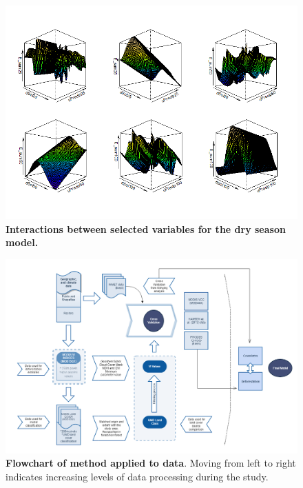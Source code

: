 \begin{landscape}
\begin{figure}[H]
  \centering
  \includegraphics[width=1.5\textwidth, inner]{visgamd.png}
\caption{\textbf{Interactions between selected variables for the dry season model.}}
\label{fig:visgamd}
\end{figure}


\begin{figure}[H]
  \centering
  \includegraphics[width=1.5\textwidth, inner]{method.png}
\caption{\textbf{Flowchart of method applied to data}. Moving from left to right indicates increasing levels of data processing during the study.}
\label{fig:method}
\end{figure}
\end{landscape}
